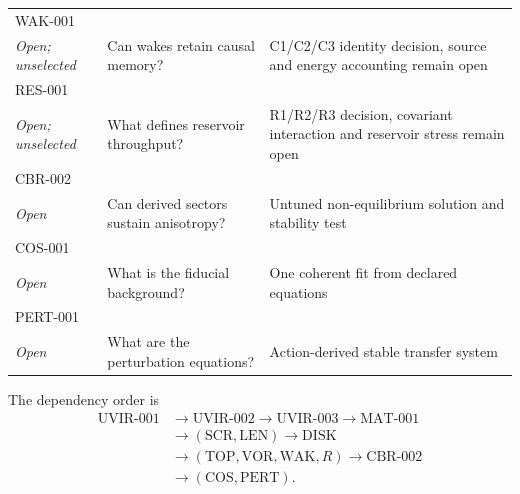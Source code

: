 \begin{center}
\begin{tabular}{@{}p{}p{}p{}@{}}
WAK-001\\\textit{Open; unselected} & Can wakes retain causal memory? & C1/C2/C3 identity decision, source and energy accounting remain open \\
RES-001\\\textit{Open; unselected} & What defines reservoir throughput? & R1/R2/R3 decision, covariant interaction and reservoir stress remain open \\
CBR-002\\\textit{Open} & Can derived sectors sustain anisotropy? & Untuned non-equilibrium solution and stability test \\
COS-001\\\textit{Open} & What is the fiducial background? & One coherent fit from declared equations \\
PERT-001\\\textit{Open} & What are the perturbation equations? & Action-derived stable transfer system \\
\bottomrule
\end{tabular}
\end{center}

The dependency order is
\begin{align}
 \mathrm{UVIR\mbox{-}001}&\to\mathrm{UVIR\mbox{-}002}
 \to\mathrm{UVIR\mbox{-}003}\to\mathrm{MAT\mbox{-}001}\nonumber\\
 &\to(\mathrm{SCR},\mathrm{LEN})\to\mathrm{DISK}\nonumber\\
 &\to(\mathrm{TOP},\mathrm{VOR},\mathrm{WAK},R)
 \to\mathrm{CBR\mbox{-}002}\nonumber\\
 &\to(\mathrm{COS},\mathrm{PERT}).
\end{align}

